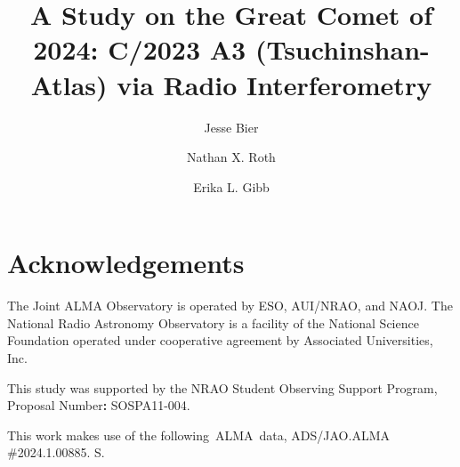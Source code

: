 \documentclass[]{aastex7}
\begin{document}
\title{A Study on the Great Comet of 2024: C/2023 A3 (Tsuchinshan-Atlas) via Radio Interferometry}

\newcommand{\jjb}[1]{\textcolor{teal}{{\scriptsize JJB:} #1}}
\newcommand{\nxr}[1]{\textcolor{red}{{\scriptsize NXR:} #1}}
\newcommand{\gibb}[1]{\textcolor{blue}{{\scriptsize Gibb:} #1}}

\newcommand{\vdag}{(v)^\dagger}
\newcommand{\aastex}{AAS\TeX}
\newcommand{\latex}{La\TeX}
\newcommand{\subs}[1]{\textsubscript{#1}}
\newcommand{\sups}[1]{\textsuperscript{#1}}
\newcommand{\rh}[1]{\textcolor{black}{{\textit{r}\subs{H}}#1}}
\newcommand{\qwater}[1]{\textcolor{black}{{\textit{Q}\subs{H2O}}#1}}
\newcommand{\fmrad}[1]{\textcolor{black}{{FoM\subs{mm}}#1}}
\newcommand{\fmir}[1]{\textcolor{black}{{FoM\subs{IR}}#1}}
\newcommand{\trot}[1]{\textcolor{black}{{\textit{T}\subs{rot}}#1}}
\newcommand{\Ju}[1]{\textcolor{black}{{\textit{J}}#1}}
\newcommand{\ie}[1]{\textcolor{black}{{\textit{i.e.,}}#1}}
\newcommand{\eg}[1]{\textcolor{black}{{\textit{e.g.,}}#1}}
\newcommand{\tkin}[1]{\textcolor{black}{{\textit{T}\subs{kin}}#1}}
\newcommand{\vexp}[1]{\textcolor{black}{{\textit{v}\subs{exp}}#1}}
\newcommand{\kms}[1]{\textcolor{black}{{km\,s\(^{-1}\)}#1}}
\newcommand{\ps}[1]{\textcolor{black}{{s\(^{-1}\)}#1}}

\newcommand{\methanol}{CH\subs{3}OH}


\author[0009-0000-5943-3124]{Jesse Bier}

\author[0000-0002-6006-9574]{Nathan X. Roth}

\author[0000-0003-0142-5265]{Erika L. Gibb}







\section{Acknowledgements}\label{acknowledgements}

The Joint ALMA Observatory is operated by ESO, AUI/NRAO, and NAOJ. The National Radio Astronomy Observatory is a facility of the National Science Foundation operated under cooperative agreement by Associated Universities, Inc.

This study was supported by the NRAO Student Observing Support Program, Proposal Number\textbf{:} SOSPA11-004.

This work makes use of the following~ALMA~data, ADS/JAO.ALMA \#2024.1.00885. S.



\end{document}
